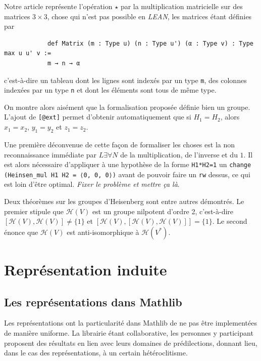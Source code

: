 \documentclass[10pt]{article}
\theoremstyle{definition}
\begin{document}
Notre article représente l'opération $\star$ par la multiplication matricielle sur des matrices $3\times3$, chose qui n'est pas possible en \textit{LEAN}, les matrices étant définies par 
\begin{center}
	\begin{tcolorbox}[title = $L\exists\forall N$,width=12cm,text width=12cm,colback=lightgray!30,
		colframe=gray,sharp corners,
		rounded corners=uphill ]
		\begin{lstlisting}
			def Matrix (m : Type u) (n : Type u') (α : Type v) : Type max u u' v :=
			m → n → α
		\end{lstlisting}
	\end{tcolorbox}
\end{center}
c'est-à-dire un tableau dont les lignes sont indexés par un type \lstinline|m|, des colonnes indexées par un type \lstinline|n| et dont les éléments sont tous de même type.
\newline

On montre alors aisément que  la formalisation proposée définie bien un groupe. L'ajout de \lstinline|[@ext]| permet d'obtenir automatiquement que si $H_1=H_2$, alors $x_1=x_2$, $y_1=y_2$ et $z_1=z_2$.
\newline

Une première déconvenue de cette façon de formaliser les choses est la non reconnaissance immédiate par $L\exists\forall N$ de la multiplication, de l'inverse et du $1$. Il est alors nécessaire d'appliquer à une hypothèse de la forme \lstinline|H1*H2=1| un \lstinline|change (Heinsen_mul H1 H2 = ⟨0, 0, 0⟩)| avant de pouvoir faire un \lstinline|rw| dessus, ce qui est loin d'être optimal.
\textit{Fixer le problème et mettre ça là}.
\newline

Deux théorèmes sur les groupes d'Heisenberg sont entre autres démontrés. Le premier stipule que $\mathcal{H}(V)$ est un groupe nilpotent d'ordre 2, c'est-à-dire $[\mathcal{H}(V),\mathcal{H}(V)]\ne\{1\}$ et $[\mathcal{H}(V),[\mathcal{H}(V),\mathcal{H}(V)]]=\{1\}$.
\newline
Le second énonce que $\mathcal{H}(V)$ est anti-isomorphique à $\mathcal{H}(V^*)$.


\section{Représentation induite}

\subsection{Les représentations dans Mathlib}
Les représentations ont la particularité dans Mathlib de ne pas être implementées de manière uniforme. La librairie étant collaborative, les personnes y participant proposent des résultats en lien avec leurs domaines de prédilections, donnant lieu, dans le cas des représentations, à un certain hétéroclitisme.
\newline
\end{document}
